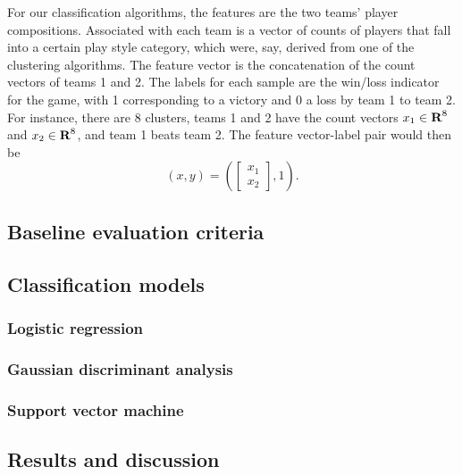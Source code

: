 \documentclass[letterpaper,10 pt,conference]{ieeeconf}
\begin{document}
For our classification algorithms, the features are the two teams' player compositions. Associated with each team is a vector of counts of players that fall into a certain play style category, which were, say, derived from one of the clustering algorithms. The feature vector is the concatenation of the count vectors of teams 1 and 2. The labels for each sample are the win/loss indicator for the game, with 1 corresponding to a victory and 0 a loss by team 1 to team 2. For instance, there are 8 clusters, teams 1 and 2 have the count vectors $x_{1}\in{\mbox{\bf R}}^{8}$ and $x_{2}\in{\mbox{\bf R}}^{8}$, and team 1 beats team 2. The feature vector-label pair would then be 
\[
  \left(x, y\right) = 
  \left(
    \left[
      \begin{array}{c}
        x_{1} \\ 
        x_{2}
      \end{array}
    \right],
    1
  \right).
\]

\subsection{Baseline evaluation criteria}



\subsection{Classification models}

\subsubsection{Logistic regression}



\subsubsection{Gaussian discriminant analysis}



\subsubsection{Support vector machine}



\subsection{Results and discussion}
\end{document}
